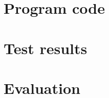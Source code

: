 \documentclass[a4paper,10pt]{article}
\begin{document}
\newpage
\section{Program code}
\lstset{style=code}


\newpage


%

\section{Test results}


\section{Evaluation}
\end{document}
